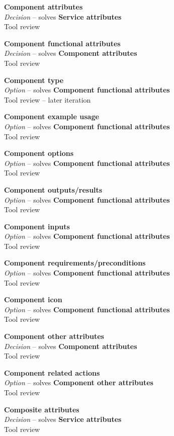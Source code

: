 \textbf{Component attributes} \\ \emph{Decision} -- solves \textbf{Service attributes} \\ Tool review

\textbf{Component functional attributes} \\ \emph{Decision} -- solves \textbf{Component attributes} \\ Tool review

\textbf{Component type} \\ \emph{Option} -- solves \textbf{Component functional attributes} \\ Tool review  -- later iteration

\textbf{Component example usage} \\ \emph{Option} -- solves \textbf{Component functional attributes} \\ Tool review

\textbf{Component options} \\ \emph{Option} -- solves \textbf{Component functional attributes} \\ Tool review

\textbf{Component outputs/results} \\ \emph{Option} -- solves \textbf{Component functional attributes} \\ Tool review

\textbf{Component inputs} \\ \emph{Option} -- solves \textbf{Component functional attributes} \\ Tool review

\textbf{Component requirements/preconditions} \\ \emph{Option} -- solves \textbf{Component functional attributes} \\ Tool review

\textbf{Component icon} \\ \emph{Option} -- solves \textbf{Component functional attributes} \\ Tool review

\textbf{Component other attributes} \\ \emph{Decision} -- solves \textbf{Component attributes} \\ Tool review

\textbf{Component related actions} \\ \emph{Option} -- solves \textbf{Component other attributes} \\ Tool review

\textbf{Composite attributes} \\ \emph{Decision} -- solves \textbf{Service attributes} \\ Tool review

